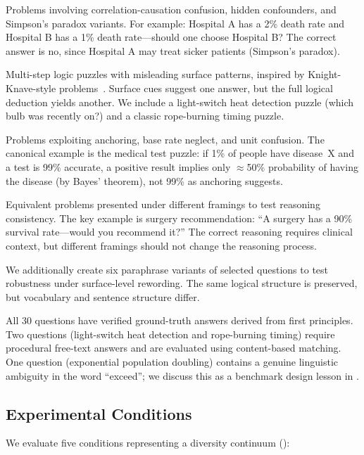 Problems involving correlation-causation confusion, hidden confounders,
and Simpson's paradox variants.
For example: Hospital A has a 2\% death rate and Hospital B has a 1\% death rate---should
one choose Hospital B? The correct answer is no, since Hospital A may treat sicker patients
(Simpson's paradox).

Multi-step logic puzzles with misleading surface patterns, inspired by
Knight-Knave-style problems~\citep{wu2025debate}.
Surface cues suggest one answer, but the full logical deduction yields another.
We include a light-switch heat detection puzzle (which bulb was recently on?)
and a classic rope-burning timing puzzle.

Problems exploiting anchoring, base rate neglect, and unit confusion.
The canonical example is the medical test puzzle: if 1\% of people have disease~X
and a test is 99\% accurate, a positive result implies only $\approx$50\% probability
of having the disease (by Bayes' theorem), not 99\% as anchoring suggests.

Equivalent problems presented under different framings to test reasoning consistency.
The key example is surgery recommendation: ``A surgery has a 90\% survival rate---would
you recommend it?'' The correct reasoning requires clinical context, but different
framings should not change the reasoning process.

We additionally create six paraphrase variants of selected questions
to test robustness under surface-level rewording.
The same logical structure is preserved, but vocabulary and sentence structure differ.

All 30 questions have verified ground-truth answers derived from first principles.
Two questions (light-switch heat detection and rope-burning timing) require procedural
free-text answers and are evaluated using content-based matching.
One question (exponential population doubling) contains a genuine linguistic ambiguity
in the word ``exceed''; we discuss this as a benchmark design lesson in .

\subsection{Experimental Conditions}

We evaluate five conditions representing a diversity continuum
():

